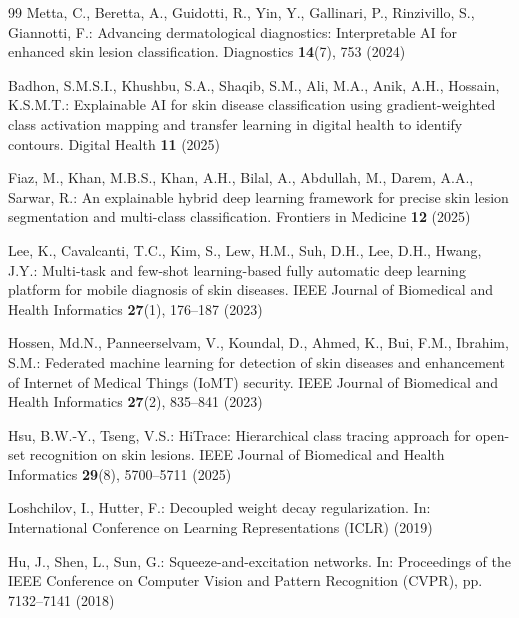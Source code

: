 \documentclass[pdflatex,sn-mathphys-num]{sn-jnl}%
\begin{document}
\begin{thebibliography}{99}
Metta, C., Beretta, A., Guidotti, R., Yin, Y., Gallinari, P., Rinzivillo, S., Giannotti, F.:
Advancing dermatological diagnostics: Interpretable AI for enhanced skin lesion classification.
Diagnostics \textbf{14}(7), 753 (2024)

Badhon, S.M.S.I., Khushbu, S.A., Shaqib, S.M., Ali, M.A., Anik, A.H., Hossain, K.S.M.T.:
Explainable AI for skin disease classification using gradient-weighted class activation mapping
and transfer learning in digital health to identify contours. Digital Health \textbf{11} (2025)

Fiaz, M., Khan, M.B.S., Khan, A.H., Bilal, A., Abdullah, M., Darem, A.A., Sarwar, R.: An
explainable hybrid deep learning framework for precise skin lesion segmentation and multi-class
classification. Frontiers in Medicine \textbf{12} (2025)

Lee, K., Cavalcanti, T.C., Kim, S., Lew, H.M., Suh, D.H., Lee, D.H., Hwang, J.Y.: Multi-task
and few-shot learning-based fully automatic deep learning platform for mobile diagnosis of skin
diseases. IEEE Journal of Biomedical and Health Informatics \textbf{27}(1), 176--187 (2023)

Hossen, Md.N., Panneerselvam, V., Koundal, D., Ahmed, K., Bui, F.M., Ibrahim, S.M.: Federated
machine learning for detection of skin diseases and enhancement of Internet of Medical Things
(IoMT) security. IEEE Journal of Biomedical and Health Informatics \textbf{27}(2), 835--841
(2023)

Hsu, B.W.-Y., Tseng, V.S.: HiTrace: Hierarchical class tracing approach for open-set
recognition on skin lesions. IEEE Journal of Biomedical and Health Informatics \textbf{29}(8),
5700--5711 (2025)

Loshchilov, I., Hutter, F.: Decoupled weight decay regularization. In: International Conference
on Learning Representations (ICLR) (2019)

Hu, J., Shen, L., Sun, G.: Squeeze-and-excitation networks. In: Proceedings of the IEEE
Conference on Computer Vision and Pattern Recognition (CVPR), pp. 7132--7141 (2018)

\end{thebibliography}
\end{document}
